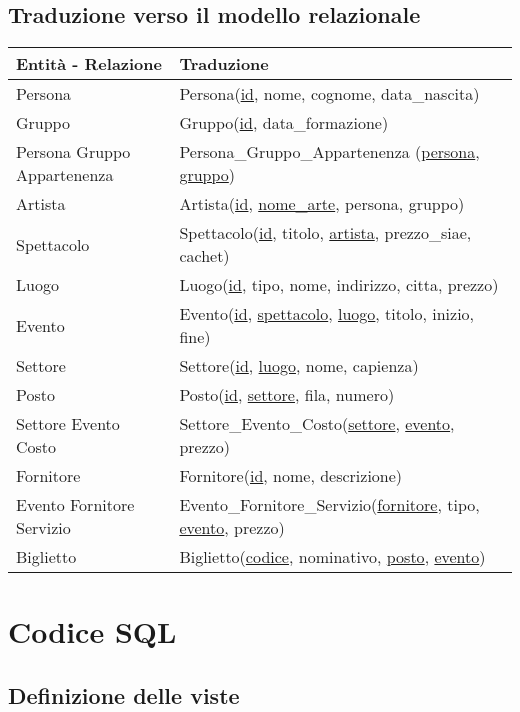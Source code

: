 \documentclass[a4paper,11pt]{article}
\begin{document}
\subsection{Traduzione verso il modello relazionale}
\begin{tabularx}{\textwidth}{|X|>{\raggedright\arraybackslash}X|}
\hline
  \textbf{Entità - Relazione} & \textbf{Traduzione}\\
\hline
  Persona & Persona(\underline{id}, nome, cognome, data\_nascita) \\
\hline
  Gruppo & Gruppo(\underline{id}, data\_formazione) \\
\hline
  Persona Gruppo Appartenenza & Persona\_Gruppo\_Appartenenza (\underline{persona}, \underline{gruppo}) \\
\hline
  Artista & Artista(\underline{id}, \underline{nome\_arte}, persona, gruppo) \\
\hline
  Spettacolo & Spettacolo(\underline{id}, titolo, \underline{artista}, prezzo\_siae, cachet) \\
\hline
  Luogo & Luogo(\underline{id}, tipo, nome, indirizzo, citta, prezzo) \\
\hline
  Evento & Evento(\underline{id}, \underline{spettacolo}, \underline{luogo}, titolo, inizio, fine) \\
\hline
  Settore & Settore(\underline{id}, \underline{luogo}, nome, capienza) \\
\hline
  Posto & Posto(\underline{id}, \underline{settore}, fila, numero) \\
\hline
  Settore Evento Costo & Settore\_Evento\_Costo(\underline{settore}, \underline{evento}, prezzo) \\
\hline
  Fornitore & Fornitore(\underline{id}, nome, descrizione) \\
\hline
  Evento Fornitore Servizio & Evento\_Fornitore\_Servizio(\underline{fornitore}, tipo, \underline{evento}, prezzo) \\
\hline
  Biglietto & Biglietto(\underline{codice}, nominativo, \underline{posto}, \underline{evento}) \\
\hline
\end{tabularx}

\section{Codice SQL}

\subsection{Definizione delle viste}

\end{document}
